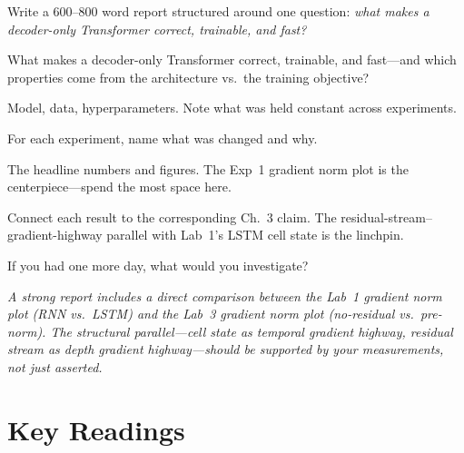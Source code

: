 Write a 600--800 word report structured around one question: \emph{what makes a decoder-only Transformer correct, trainable, and fast?}

\begin{description}[style=nextline, leftmargin=1.5em]
    \item[Question.] What makes a decoder-only Transformer correct, trainable, and fast---and which properties come from the architecture vs.\ the training objective?
    \item[Setup.] Model, data, hyperparameters. Note what was held constant across experiments.
    \item[Interventions.] For each experiment, name what was changed and why.
    \item[Results.] The headline numbers and figures. The Exp~1 gradient norm plot is the centerpiece---spend the most space here.
    \item[Diagnosis.] Connect each result to the corresponding Ch.~3 claim. The residual-stream--gradient-highway parallel with Lab~1's LSTM cell state is the linchpin.
    \item[Next step.] If you had one more day, what would you investigate?
\end{description}

\noindent\textit{A strong report includes a direct comparison between the Lab~1 gradient norm plot (RNN vs.\ LSTM) and the Lab~3 gradient norm plot (no-residual vs.\ pre-norm). The structural parallel---cell state as temporal gradient highway, residual stream as depth gradient highway---should be supported by your measurements, not just asserted.}


\section*{Key Readings}

\nocite{vaswani2017attention,radford2018improving}

